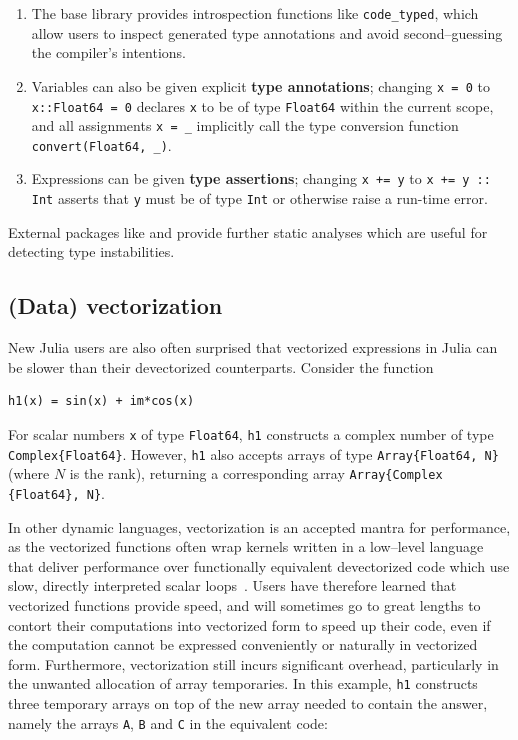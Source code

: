 \documentclass[pldi]{sigplanconf-pldi15}
\begin{document}
\begin{enumerate}

	\item The base library provides introspection functions like
	\verb|code_typed|, which allow users to inspect generated type
	annotations and avoid second--guessing the compiler's intentions.
		
	\item Variables can also be given explicit \textbf{type annotations};
	changing \verb|x = 0| to \verb|x::Float64 = 0| declares \verb|x| to be
	of type \verb|Float64| within the current scope, and all assignments
	\verb|x = _| implicitly call the type conversion function
	\verb|convert(Float64, _)|.

	\item Expressions can be given \textbf{type assertions}; changing
	\verb|x += y| to \verb|x += y :: Int| asserts that \verb|y| must be of
	type \verb|Int| or otherwise raise a run-time error.

\end{enumerate}
%
External packages like  and  provide
further static analyses which are useful for detecting type instabilities.


\subsection{(Data) vectorization}

New Julia users are also often surprised that vectorized expressions in Julia
can be slower than their devectorized counterparts. Consider the function

\begin{lstlisting}
h1(x) = sin(x) + im*cos(x)
\end{lstlisting}
%
For scalar numbers \verb|x| of type \verb|Float64|, \verb|h1| constructs a
complex number of type \verb|Complex{Float64}|. However, \verb|h1| also accepts
arrays of type \verb|Array{Float64, N}| (where $N$ is the rank), returning a
corresponding array \verb|Array{Complex| \verb|{Float64}, N}|.

In other dynamic languages, vectorization is an accepted mantra for
performance, as the vectorized functions often wrap kernels written in a
low--level language that deliver performance over functionally equivalent
devectorized code which use slow, directly interpreted scalar
loops~\cite{Seljebotn2009,Walt2011}. Users have therefore learned that
vectorized functions provide speed, and will sometimes go to great lengths to
contort their computations into vectorized form to speed up their code, even if
the computation cannot be expressed conveniently or naturally in vectorized
form. Furthermore, vectorization still incurs significant overhead,
particularly in the unwanted allocation of array temporaries. In this example,
\verb|h1| constructs three temporary arrays on top of the new array needed to
contain the answer, namely the arrays \verb|A|, \verb|B| and \verb|C| in the
equivalent code: 
\end{document}
